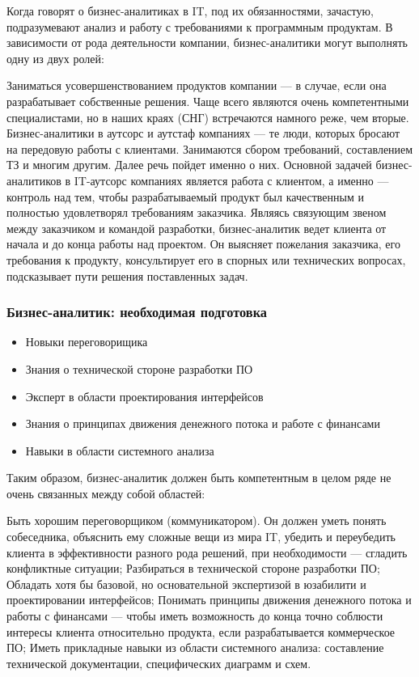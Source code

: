 \documentclass{../industrial-development}
\begin{document}
\lecturenotes
Когда говорят о бизнес-аналитиках в IT, под их обязанностями, зачастую, подразумевают анализ и работу с требованиями к программным продуктам. В зависимости от рода деятельности компании, бизнес-аналитики могут выполнять одну из двух ролей:

Заниматься усовершенствованием продуктов компании — в случае, если она разрабатывает собственные решения. Чаще всего являются очень компетентными специалистами, но в наших краях (СНГ) встречаются намного реже, чем вторые.
Бизнес-аналитики в аутсорс и аутстаф компаниях — те люди, которых бросают на передовую работы с клиентами. Занимаются сбором требований, составлением ТЗ и многим другим. Далее речь пойдет именно о них.
Основной задачей бизнес-аналитиков в IT-аутсорс компаниях является работа с клиентом, а именно — контроль над тем, чтобы разрабатываемый продукт был качественным и полностью удовлетворял требованиям заказчика.
Являясь связующим звеном между заказчиком и командой разработки, бизнес-аналитик ведет клиента от начала и до конца работы над проектом. Он выясняет пожелания заказчика, его требования к продукту, консультирует его в спорных или технических вопросах, подсказывает пути решения поставленных задач.~\cite{Business}
 

\begin{frame} \frametitle{Бизнес-аналитик: необходимая подготовка}
  \begin{itemize}
  \item Новыки переговорищика
  \item Знания о технической стороне разработки ПО
  \item Эксперт в области проектирования интерфейсов 
  \item Знания о принципах движения денежного потока и работе с финансами 
  \item Навыки в области системного анализа
  \end{itemize}
\end{frame}

\lecturenotes
Таким образом, бизнес-аналитик должен быть компетентным в целом ряде не очень связанных между собой областей:

Быть хорошим переговорщиком (коммуникатором). Он должен уметь понять собеседника, объяснить ему сложные вещи из мира IT, убедить и переубедить клиента в эффективности разного рода решений, при необходимости — сгладить конфликтные ситуации;
Разбираться в технической стороне разработки ПО;
Обладать хотя бы базовой, но основательной экспертизой в юзабилити и проектировании интерфейсов;
Понимать принципы движения денежного потока и работы с финансами — чтобы иметь возможность до конца точно соблюсти интересы клиента относительно продукта, если разрабатывается коммерческое ПО;
Иметь прикладные навыки из области системного анализа: составление технической документации, специфических диаграмм и схем.
\end{document}
